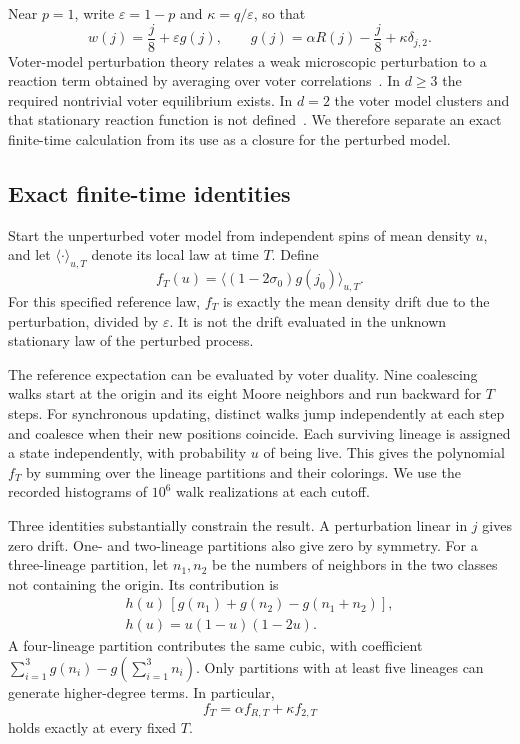 \documentclass[pre,twocolumn,superscriptaddress,showpacs,floatfix]{revtex4-2}
\begin{document}
Near $p=1$, write $\varepsilon=1-p$ and $\kappa=q/\varepsilon$, so that
\begin{equation}
 w(j)=\frac j8+\varepsilon g(j),\qquad
 g(j)=\alpha R(j)-\frac j8+\kappa\delta_{j,2}.
 \label{eq:pert}
\end{equation}
Voter-model perturbation theory relates a weak microscopic perturbation to a reaction
term obtained by averaging over voter correlations~\cite{cox2013}. In $d\ge3$ the
required nontrivial voter equilibrium exists. In $d=2$ the voter model clusters and
that stationary reaction function is not defined~\cite{cox2025}. We therefore
separate an exact finite-time calculation from its use as a closure for the
perturbed model.

\subsection{Exact finite-time identities}

Start the unperturbed voter model from independent spins of mean density $u$, and
let $\langle\cdot\rangle_{u,T}$ denote its local law at time $T$. Define
\begin{equation}
 f_T(u)=\big\langle(1-2\sigma_0)g(j_0)\big\rangle_{u,T}.
 \label{eq:f}
\end{equation}
For this specified reference law, $f_T$ is exactly the mean density drift due to
the perturbation, divided by $\varepsilon$. It is not the drift evaluated in the
unknown stationary law of the perturbed process.

The reference expectation can be evaluated by voter duality. Nine coalescing walks
start at the origin and its eight Moore neighbors and run backward for $T$ steps.
For synchronous updating, distinct walks jump independently at each step and
coalesce when their new positions coincide. Each surviving lineage is assigned a
state independently, with probability $u$ of being live. This gives the polynomial
$f_T$ by summing over the lineage partitions and their colorings. We use the
recorded histograms of $10^6$ walk realizations at each cutoff.

Three identities substantially constrain the result. A perturbation linear in
$j$ gives zero drift. One- and two-lineage partitions also give zero by symmetry.
For a three-lineage partition, let $n_1,n_2$ be the numbers of neighbors in the
two classes not containing the origin. Its contribution is
\begin{equation}
 \begin{gathered}
 h(u)\,[g(n_1)+g(n_2)-g(n_1+n_2)],\\
 h(u)=u(1-u)(1-2u).
 \end{gathered}
 \label{eq:three}
\end{equation}
A four-lineage partition contributes the same cubic, with coefficient
$\sum_{i=1}^3g(n_i)-g(\sum_{i=1}^3 n_i)$.
Only partitions with at least five lineages can generate higher-degree terms.
In particular,
\begin{equation}
 f_T=\alpha f_{R,T}+\kappa f_{2,T}
 \label{eq:linearclosure}
\end{equation}
holds exactly at every fixed $T$.
\end{document}
